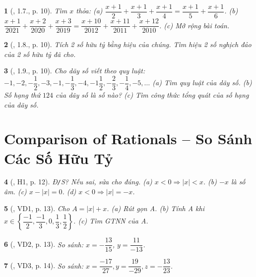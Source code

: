 \documentclass{article}
\newtheorem{baitoan}{}
\begin{document}
\begin{baitoan}[\cite{Binh_boi_duong_Toan_7_tap_1}, 1.7., p. 10]
	Tìm $x$ thỏa: (a) $\dfrac{x + 1}{2} + \dfrac{x + 1}{3} + \dfrac{x + 1}{4} = \dfrac{x + 1}{5} + \dfrac{x + 1}{6}$. (b) $\dfrac{x + 1}{2021} + \dfrac{x + 2}{2020} + \dfrac{x + 3}{2019} = \dfrac{x + 10}{2012} + \dfrac{x + 11}{2011} + \dfrac{x + 12}{2010}$. (c) Mở rộng bài toán.
\end{baitoan}

\begin{baitoan}[\cite{Binh_boi_duong_Toan_7_tap_1}, 1.8., p. 10]
	Tích 2 số hữu tỷ bằng hiệu của chúng. Tìm hiệu 2 số nghịch đảo của 2 số hữu tỷ đã cho.
\end{baitoan}

\begin{baitoan}[\cite{Binh_boi_duong_Toan_7_tap_1}, 1.9., p. 10]
	Cho dãy số viết theo quy luật: $-1,-2,-\dfrac{1}{2},-3,-1,-\dfrac{1}{3},-4,-1\dfrac{1}{2},-\dfrac{2}{3},-\dfrac{1}{4},-5,\ldots$ (a) Tìm quy luật của dãy số. (b) Số hạng thứ $124$ của dãy số là số nào? (c) Tìm công thức tổng quát của số hạng của dãy số.
\end{baitoan}


\section{Comparison of Rationals -- So Sánh Các Số Hữu Tỷ}

\begin{baitoan}[\cite{Binh_boi_duong_Toan_7_tap_1}, H1, p. 12]
	{\rm Đ{\tt/}S?} Nếu sai, sửa cho đúng. (a) $x < 0\Rightarrow|x| < x$. (b) $-x$ là số âm. (c) $x - |x| = 0$. (d) $x < 0\Rightarrow|x| = -x$.
\end{baitoan}

\begin{baitoan}[\cite{Binh_boi_duong_Toan_7_tap_1}, VD1, p. 13]
	Cho $A = |x| + x$. (a) Rút gọn A. (b) Tính A khi $x\in\left\{\dfrac{-1}{2},\dfrac{-1}{3},0,\dfrac{1}{3},\dfrac{1}{2}\right\}$. (c) Tìm {\rm GTNN} của A.
\end{baitoan}

\begin{baitoan}[\cite{Binh_boi_duong_Toan_7_tap_1}, VD2, p. 13]
	So sánh: $x = -\dfrac{13}{15}$, $y = \dfrac{11}{-13}$.
\end{baitoan}

\begin{baitoan}[\cite{Binh_boi_duong_Toan_7_tap_1}, VD3, p. 14]
	So sánh: $x = \dfrac{-17}{27},y = \dfrac{19}{-29},z = -\dfrac{13}{23}$.
\end{baitoan}
\end{document}

